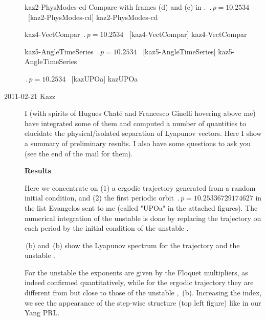 \begin{description}
{kaz2-PhysModes-cd}   %
{}   %
{    %
Compare with frames (d) and (e) in .
$\period{p}=10.2534$ \po\ [kaz2-PhysModes-cd]
}
{kaz2-PhysModes-cd}   %

{kaz4-VectCompar}   %
{}   %
{    %
$\period{p}=10.2534$ \po\ [kaz4-VectCompar]
}
{kaz4-VectCompar}   %

{kaz5-AngleTimeSeries}   %
{}   %
{    %
$\period{p}=10.2534$ \po\ [kaz5-AngleTimeSeries]
}
{kaz5-AngleTimeSeries}   %

{}   %
{    %
$\period{p}=10.2534$ \po\ [kazUPOa]
}
{kazUPOa}   %

\item[2011-02-21 Kazz]
I (with spirits of Hugues Chat\'e and Francesco Ginelli hovering above me)
have integrated some of
them and computed a number of quantities to elucidate the
physical/isolated separation of Lyapunov vectors. Here I show a
summary of preliminary results. I also have some questions to ask you
(see the end of the mail for them).


\textbf{Results}

Here we concentrate on (1) a ergodic trajectory generated from a random
initial condition, and (2) the first periodic orbit
$\period{p}=10.25336729174627$ in the list
Evangelos sent to me (called "UPOa" in the attached
figures). The numerical integration of the {unstable \po} is done by replacing the
trajectory on each period by the initial condition of the {unstable \po}.

\,(b)
and
\,(b)
show the Lyapunov spectrum for
the trajectory and the {unstable \po}.

For the {unstable \po} the exponents are
given by the Floquet multipliers, as indeed confirmed quantitatively,
while for the ergodic trajectory they are different from but close to
those of the {unstable \po}, \,(b).
Increasing the index, we
see the appearance of the step-wise structure (top left figure) like in
our Yang \etal{} PRL.


\end{description}

